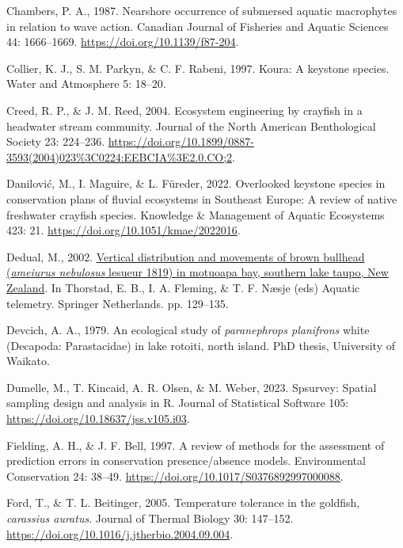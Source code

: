 \documentclass[
  letterpaper,
  DIV=11,
  numbers=noendperiod]{scrartcl}
\newlength{\cslhangindent}
\newenvironment{CSLReferences}[2] %
 {\begin{list}{}{%
  \setlength{\itemindent}{0pt}
  \setlength{\leftmargin}{0pt}
  \setlength{\parsep}{0pt}
  \ifodd #1
   \setlength{\leftmargin}{\cslhangindent}
   \setlength{\itemindent}{-1\cslhangindent}
  \fi
  \setlength{\itemsep}{#2\baselineskip}}}
 {\end{list}}
\begin{document}
\begin{CSLReferences}{0}{1}
Chambers, P. A., 1987. Nearshore occurrence of submersed aquatic
macrophytes in relation to wave action. Canadian Journal of Fisheries
and Aquatic Sciences 44: 1666--1669.
\url{https://doi.org/10.1139/f87-204}.

Collier, K. J., S. M. Parkyn, \& C. F. Rabeni, 1997. Koura: A keystone
species. Water and Atmosphere 5: 18--20.

Creed, R. P., \& J. M. Reed, 2004. Ecosystem engineering by crayfish in
a headwater stream community. Journal of the North American
Benthological Society 23: 224--236.
\url{https://doi.org/10.1899/0887-3593(2004)023\%3C0224:EEBCIA\%3E2.0.CO;2}.

Danilović, M., I. Maguire, \& L. Füreder, 2022. Overlooked keystone
species in conservation plans of fluvial ecosystems in {Southeast
Europe}: A review of native freshwater crayfish species. Knowledge \&
Management of Aquatic Ecosystems 423: 21.
\url{https://doi.org/10.1051/kmae/2022016}.

Dedual, M., 2002.
\href{https://doi.org/10.1007/978-94-017-0771-8_15}{Vertical
distribution and movements of brown bullhead (\emph{ameiurus nebulosus}
lesueur 1819) in motuoapa bay, southern lake taupo, {New Zealand}}. In
Thorstad, E. B., I. A. Fleming, \& T. F. Næsje (eds) Aquatic telemetry.
Springer Netherlands. pp. 129--135.

Devcich, A. A., 1979. An ecological study of \emph{paranephrops
planifrons} white ({Decapoda}: {Parastacidae}) in lake rotoiti, north
island. PhD thesis, University of Waikato.

Dumelle, M., T. Kincaid, A. R. Olsen, \& M. Weber, 2023. Spsurvey:
Spatial sampling design and analysis in {R}. Journal of Statistical
Software 105: \url{https://doi.org/10.18637/jss.v105.i03}.

Fielding, A. H., \& J. F. Bell, 1997. A review of methods for the
assessment of prediction errors in conservation presence/absence models.
Environmental Conservation 24: 38--49.
\url{https://doi.org/10.1017/S0376892997000088}.

Ford, T., \& T. L. Beitinger, 2005. Temperature tolerance in the
goldfish, \emph{carassius auratus}. Journal of Thermal Biology 30:
147--152. \url{https://doi.org/10.1016/j.jtherbio.2004.09.004}.


\end{CSLReferences}
\end{document}
